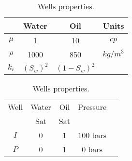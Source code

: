 \documentclass[12pt]{article}
\begin{document}
\begin{table}\hspace{-1cm}
\begin{minipage}{.4\textwidth}%
\centering
\begin{tabular}{ |c|c|c|c|} 
\hline
&Water&Oil&Units\\
\hline
$\mu$&     1&    10 & $cp$  \\  
$\rho$& 1000& 850& $kg/m^3$\\
$k_r$&$(S_w)^2$&   $(1-S_w)^2$ &  \\
\hline
\end{tabular}
\caption{Fluids properties.}\label{table:fluidsw}
\end{minipage}%
\hspace{0.5cm} 
\centering
\begin{minipage}{.4\textwidth}
\begin{tabular}{ |c|c|c|c|c|} 
\hline
Well&Water&Oil &Pressure\\
&Sat&Sat&\\
\hline
$I$&     0&    1 & $100$ bars \\  
$P$& 0& 1& $0$ bars\\
\hline
\end{tabular}
\caption{Wells properties.}\label{table:wells1}
\end{minipage}
\end{table}

\end{document}
